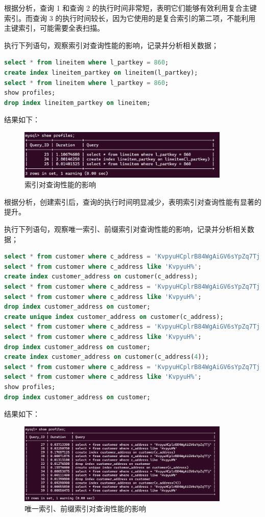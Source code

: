 \documentclass{article}
\begin{document}
根据分析，查询 1 和查询 2 的执行时间非常短，表明它们能够有效利用复合主键索引。而查询 3 的执行时间较长，因为它使用的是复合索引的第二项，不能利用主键索引，可能需要全表扫描。

执行下列语句，观察索引对查询性能的影响，记录并分析相关数据；

\begin{lstlisting}[language=sql]
select * from lineitem where l_partkey = 860;
create index lineitem_partkey on lineitem(l_partkey);
select * from lineitem where l_partkey = 860;
show profiles;
drop index lineitem_partkey on lineitem;
\end{lstlisting}

结果如下：

\begin{figure}[H]
\centering
\includegraphics[width=0.9\textwidth]{img/17.png}
\caption{索引对查询性能的影响}
\end{figure}

根据分析，创建索引后，查询的执行时间明显减少，表明索引对查询性能有显著的提升。

执行下列语句，观察唯一索引、前缀索引对查询性能的影响，记录并分析相关数据；

\begin{lstlisting}[language=sql]
select * from customer where c_address = 'KvpyuHCplrB84WgAiGV6sYpZq7Tj';
select * from customer where c_address like 'KvpyuH%';
create index customer_address on customer(c_address);
select * from customer where c_address = 'KvpyuHCplrB84WgAiGV6sYpZq7Tj';
select * from customer where c_address like 'KvpyuH%';
drop index customer_address on customer;
create unique index customer_address on customer(c_address);
select * from customer where c_address = 'KvpyuHCplrB84WgAiGV6sYpZq7Tj';
select * from customer where c_address like 'KvpyuH%';
drop index customer_address on customer;
create index customer_address on customer(c_address(4));
select * from customer where c_address = 'KvpyuHCplrB84WgAiGV6sYpZq7Tj';
select * from customer where c_address like 'KvpyuH%';
show profiles;
drop index customer_address on customer;
\end{lstlisting}

结果如下：

\begin{figure}[H]
\centering
\includegraphics[width=0.9\textwidth]{img/18.png}
\caption{唯一索引、前缀索引对查询性能的影响}
\end{figure}
\end{document}
